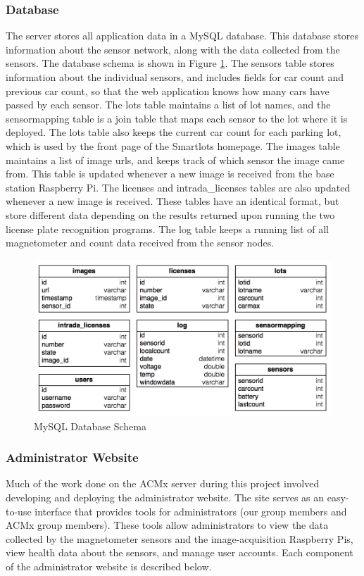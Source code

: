 \documentclass[11pt, oneside, fullpage, doublespace]{article}
\begin{document}
\subsubsection{Database}
The server stores all application data in a MySQL database. This database stores information about the sensor network, along with the data collected from the sensors. The database schema is shown in Figure \ref{fig:schema}. The sensors table stores information about the individual sensors, and includes fields for car count and previous car count, so that the web application knows how many cars have passed by each sensor. The lots table maintains a list of lot names, and the sensormapping table is a join table that maps each sensor to the lot where it is deployed. The lots table also keeps the current car count for each parking lot, which is used by the front page of the Smartlots homepage. The images table maintains a list of image urls, and keeps track of which sensor the image came from. This table is updated whenever a new image is received from the base station Raspberry Pi. The licenses and intrada\_licenses tables are also updated whenever a new image is received. These tables have an identical format, but store different data depending on the results returned upon running the two license plate recognition programs. The log table keeps a running list of all magnetometer and count data received from the sensor nodes.

\begin{figure}
\begin{center}
\includegraphics[width=5in]{schema}
\end{center}
\caption{MySQL Database Schema}
\label{fig:schema}
\end{figure}

\subsubsection{Administrator Website}
Much of the work done on the ACMx server during this project involved developing and deploying the administrator website. The site serves as an easy-to-use interface that provides tools for administrators (our group members and ACMx group members). These tools allow administrators to view the data collected by the magnetometer sensors and the image-acquisition Raspberry Pis, view health data about the sensors, and manage user accounts. Each component of the administrator website is described below.
\end{document}
